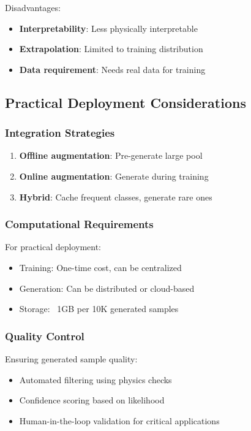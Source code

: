 \documentclass[journal]{IEEEtran}
\begin{document}
Disadvantages:
\begin{itemize}
\item \textbf{Interpretability}: Less physically interpretable
\item \textbf{Extrapolation}: Limited to training distribution
\item \textbf{Data requirement}: Needs real data for training
\end{itemize}

\subsection{Practical Deployment Considerations}

\subsubsection{Integration Strategies}
\begin{enumerate}
\item \textbf{Offline augmentation}: Pre-generate large pool
\item \textbf{Online augmentation}: Generate during training
\item \textbf{Hybrid}: Cache frequent classes, generate rare ones
\end{enumerate}

\subsubsection{Computational Requirements}
For practical deployment:
\begin{itemize}
\item Training: One-time cost, can be centralized
\item Generation: Can be distributed or cloud-based
\item Storage: ~1GB per 10K generated samples
\end{itemize}

\subsubsection{Quality Control}
Ensuring generated sample quality:
\begin{itemize}
\item Automated filtering using physics checks
\item Confidence scoring based on likelihood
\item Human-in-the-loop validation for critical applications
\end{itemize}
\end{document}
